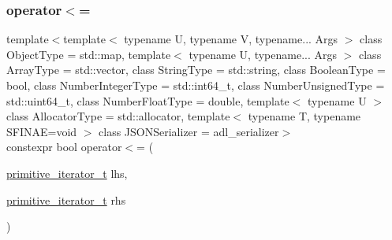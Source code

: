 \mbox{\label{classnlohmann_1_1basic__json_1_1primitive__iterator__t_a7e620963ea069fd987d941c61ec4af0c}} 
\subsubsection{\texorpdfstring{operator$<$=}{operator<=}}
{\footnotesize\ttfamily template$<$template$<$ typename U, typename V, typename... Args $>$ class Object\+Type = std\+::map, template$<$ typename U, typename... Args $>$ class Array\+Type = std\+::vector, class String\+Type  = std\+::string, class Boolean\+Type  = bool, class Number\+Integer\+Type  = std\+::int64\+\_\+t, class Number\+Unsigned\+Type  = std\+::uint64\+\_\+t, class Number\+Float\+Type  = double, template$<$ typename U $>$ class Allocator\+Type = std\+::allocator, template$<$ typename T, typename S\+F\+I\+N\+A\+E=void $>$ class J\+S\+O\+N\+Serializer = adl\+\_\+serializer$>$ \\
constexpr bool operator$<$= (\begin{DoxyParamCaption}\item[{\hyperlink{classnlohmann_1_1basic__json_1_1primitive__iterator__t}{primitive\+\_\+iterator\+\_\+t}}]{lhs,  }\item[{\hyperlink{classnlohmann_1_1basic__json_1_1primitive__iterator__t}{primitive\+\_\+iterator\+\_\+t}}]{rhs }\end{DoxyParamCaption})\hspace{0.3cm}{\ttfamily [friend]}}

\mbox{\label{classnlohmann_1_1basic__json_1_1primitive__iterator__t_aae1e1e2ec0e229d1291d69de57d76bbe}} 
